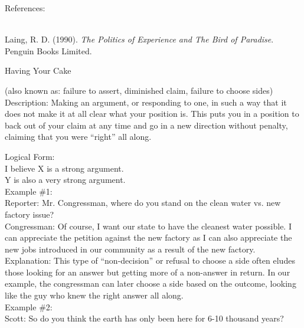 \documentclass[a4paper,12pt,single,pdftex]{scrbook}
\begin{document}
    References:

    
      
        
      \\

      
        
          Laing, R. D. (1990). {\it The Politics of Experience and The Bird of Paradise}. Penguin Books Limited.
        
      
    
  

Having Your Cake
    
      (also known as: failure to assert, diminished claim, failure to choose sides)
    \\

  
    Description: Making an argument, or responding to one, in such a way that it does not make it at all clear what your position is.  This puts you in a position to back out of your claim at any time and go in a new direction without penalty, claiming that you were “right” all along. 

    
      Logical Form:
    \\

    
      I believe X is a strong argument.
    \\

    
      Y is also a very strong argument.
    \\

    
      Example \#1:
    \\

    
      Reporter: Mr. Congressman, where do you stand on the clean water vs. new factory issue?
    \\

    
      Congressman: Of course, I want our state to have the cleanest water possible.  I can appreciate the petition against the new factory as I can also appreciate the new jobs introduced in our community as a result of the new factory.
    \\

    
      Explanation: This type of “non-decision” or refusal to choose a side often eludes those looking for an answer but getting more of a non-answer in return.  In our example, the congressman can later choose a side based on the outcome, looking like the guy who knew the right answer all along.
    \\

    
      Example \#2:
    \\

    
      Scott: So do you think the earth has only been here for 6-10 thousand years?
    \\
\end{document}
